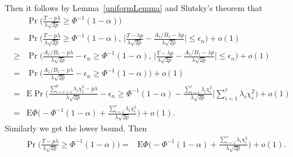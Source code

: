 \documentclass[review]{elsarticle}
\theoremstyle{plain}
\theoremstyle{definition}
\theoremstyle{remark}
\begin{document}
Then it follows by Lemma~\ref{uniformLemma} and Slutsky's theorem that
\begin{equation*}
    \begin{aligned}
        &\Pr\Big(\frac{T-p\lambda}{\lambda\sqrt{2p}}\geq \Phi^{-1}(1-\alpha)\Big)\\
        =&\Pr\Big(\frac{T-p\lambda}{\lambda\sqrt{2p}}\geq \Phi^{-1}(1-\alpha),\,
        \Big|\frac{T-{\lambda p}}{\lambda\sqrt{2p}
        }-
    \frac{{A_1}/{B_1}-{\lambda p}}{\lambda\sqrt{2p}
        }\Big|\leq\epsilon_n \Big)+o(1)\\
        \geq&\Pr\Big(\frac{A_1/B_1-p\lambda}{\lambda\sqrt{2p}}-\epsilon_n\geq  \Phi^{-1}(1-\alpha),\,
        \Big|\frac{T-{\lambda p}}{\lambda\sqrt{2p}
        }-
    \frac{{A_1}/{B_1}-{\lambda p}}{\lambda\sqrt{2p}
        }\Big|\leq\epsilon_n \Big)+o(1)\\
        =&\Pr\Big(\frac{A_1/B_1-p\lambda}{\lambda\sqrt{2p}}-\epsilon_n \geq \Phi^{-1}(1-\alpha)\Big)+o(1)\\
        =&\textrm{E}\Pr\Big(\frac{\sum_{i=r+1}^p \lambda_i \chi^2_1-p\lambda}{\lambda\sqrt{2p}}-\epsilon_n\geq  \Phi^{-1}(1-\alpha) -\frac{\sum_{i=1}^r \lambda_i \chi^2_i}{\lambda\sqrt{2p}}\Big|\sum_{i=1}^r \lambda_i \chi^2_i \Big)+o(1)\\
        =& \textrm{E}\Phi\Big( -\Phi^{-1}(1-\alpha) +\frac{\sum_{i=1}^r \lambda_i \chi^2_i}{\lambda\sqrt{2p}} \Big)+o(1).
    \end{aligned}
\end{equation*}
Similarly we get the lower bound. Then
\begin{equation*}
    \begin{aligned}
        &\Pr\Big(\frac{T-p\lambda}{\lambda\sqrt{2p}}\geq \Phi^{-1}(1-\alpha)\Big)
        =& \textrm{E}\Phi\Big( -\Phi^{-1}(1-\alpha) +\frac{\sum_{i=1}^r \lambda_i \chi^2_i}{\lambda\sqrt{2p}} \Big)+o(1).
    \end{aligned}
\end{equation*}
\end{document}
